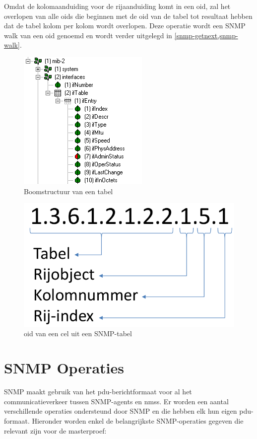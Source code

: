 Omdat de kolomaanduiding voor de rijaanduiding komt in een \gls{oid},
zal het overlopen van alle \glspl{oid} die beginnen met de \gls{oid} van de tabel tot resultaat hebben dat de tabel kolom per kolom wordt overlopen.
Deze operatie wordt een SNMP walk van een \gls{oid} genoemd en wordt verder uitgelegd in \cref{snmp-getnext,snmp-walk}.

\begin{figure}[h]
	\centering
	\includegraphics[resolution=110]{figures/snmp/ifTable-cropped}
	\caption{Boomstructuur van een tabel}
	\label{boomstructuur-tabel}
\end{figure}

\begin{figure}[h]
	\centering
	\includegraphics[scale=0.50]{figures/snmp/oid-tabel}
	\caption[OID van een cel uit een tabel]{\gls{oid} van een cel uit een SNMP-tabel}
	\label{fig-tabel-oid}
\end{figure}


\section{SNMP Operaties}
\label{snmp-operaties}
SNMP maakt gebruik van het \gls{pdu}-berichtformaat voor al het communicatieverkeer tussen SNMP-agents en \glspl{nms}.
Er worden een aantal verschillende operaties ondersteund door SNMP en die hebben elk hun eigen \gls{pdu}-formaat\cite{essentialsnmp}.
Hieronder worden enkel de belangrijkste SNMP-operaties gegeven die relevant zijn voor de masterproef:

